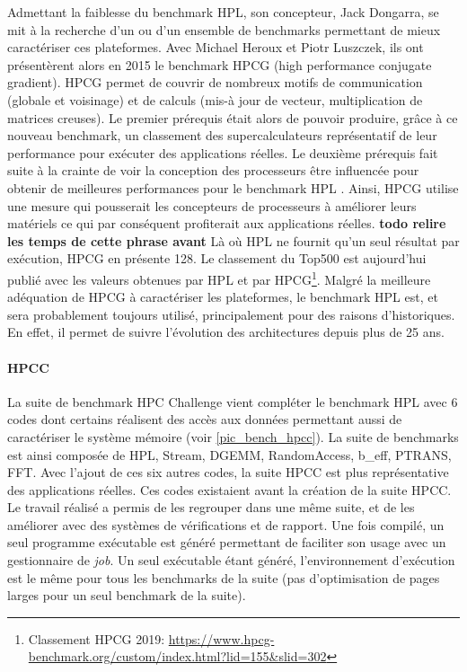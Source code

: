             Admettant la faiblesse du benchmark HPL, son concepteur, Jack Dongarra, se mit à la recherche d'un ou d'un ensemble de benchmarks permettant de mieux caractériser ces plateformes. Avec Michael Heroux et Piotr Luszczek, ils ont présentèrent alors en 2015 le benchmark HPCG (high performance conjugate gradient). HPCG permet de couvrir de nombreux motifs de communication (globale et voisinage) et de calculs  (mis-à jour de vecteur, multiplication de matrices creuses). 
            Le premier prérequis était alors de pouvoir produire, grâce à ce nouveau benchmark, un classement des supercalculateurs représentatif de leur performance pour exécuter des applications réelles. Le deuxième prérequis fait suite à la crainte de voir la conception des processeurs être influencée pour obtenir de meilleures performances pour le benchmark HPL \cite{Dongarra2013}. Ainsi, HPCG utilise une mesure qui pousserait les concepteurs de processeurs à améliorer leurs matériels ce qui par conséquent profiterait aux applications réelles. \textbf{todo relire les temps de cette phrase avant} Là où HPL ne fournit qu'un seul résultat par exécution, HPCG en présente 128. Le classement du Top500 est aujourd'hui publié avec les valeurs obtenues par HPL et par HPCG\footnote{Classement HPCG 2019: \url{https://www.hpcg-benchmark.org/custom/index.html?lid=155&slid=302}}. Malgré la meilleure adéquation de HPCG à caractériser les plateformes, le benchmark HPL est, et sera probablement toujours utilisé, principalement pour des raisons d'historiques. En effet, il permet de suivre l'évolution des architectures depuis plus de 25 ans. 
            
        \paragraph{HPCC \cite{Luszczek2006}} 
            
            La suite de benchmark HPC Challenge vient compléter le benchmark HPL avec 6 codes dont certains réalisent des accès aux données permettant aussi de caractériser le système mémoire (voir \autoref{pic_bench_hpcc}). La suite de benchmarks est ainsi composée de HPL, Stream, DGEMM, RandomAccess, b\_eff, PTRANS, FFT. Avec l'ajout de ces six autres codes, la suite HPCC est plus représentative des applications réelles. Ces codes existaient avant la création de la suite HPCC. Le travail réalisé a permis de les regrouper dans une même suite, et de les améliorer avec des systèmes de vérifications et de rapport. Une fois compilé, un seul programme exécutable est généré permettant de faciliter son usage avec un gestionnaire de \textit{job}. Un seul exécutable étant généré, l'environnement d'exécution est le même pour tous les benchmarks de la suite (pas d'optimisation de pages larges pour un seul benchmark de la suite). 
            
